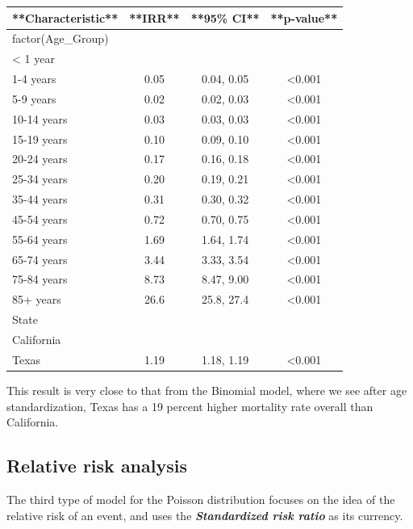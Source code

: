 \documentclass[
]{article}
\begin{document}
\begin{tabular}{l|c|c|c}
\hline
**Characteristic** & **IRR** & **95\% CI** & **p-value**\\
\hline
factor(Age\_Group) &  &  & \\
\hline
< 1 year &  &  & \\
\hline
1-4 years & 0.05 & 0.04, 0.05 & <0.001\\
\hline
5-9 years & 0.02 & 0.02, 0.03 & <0.001\\
\hline
10-14 years & 0.03 & 0.03, 0.03 & <0.001\\
\hline
15-19 years & 0.10 & 0.09, 0.10 & <0.001\\
\hline
20-24 years & 0.17 & 0.16, 0.18 & <0.001\\
\hline
25-34 years & 0.20 & 0.19, 0.21 & <0.001\\
\hline
35-44 years & 0.31 & 0.30, 0.32 & <0.001\\
\hline
45-54 years & 0.72 & 0.70, 0.75 & <0.001\\
\hline
55-64 years & 1.69 & 1.64, 1.74 & <0.001\\
\hline
65-74 years & 3.44 & 3.33, 3.54 & <0.001\\
\hline
75-84 years & 8.73 & 8.47, 9.00 & <0.001\\
\hline
85+ years & 26.6 & 25.8, 27.4 & <0.001\\
\hline
State &  &  & \\
\hline
California &  &  & \\
\hline
Texas & 1.19 & 1.18, 1.19 & <0.001\\
\hline
\end{tabular}

This result is very close to that from the Binomial model, where we see after age standardization, Texas has a 19 percent higher mortality rate overall than California.

\hypertarget{relative-risk-analysis}{%
\subsection{Relative risk analysis}\label{relative-risk-analysis}}

The third type of model for the Poisson distribution focuses on the idea of the relative risk of an event, and uses the \textbf{\emph{Standardized risk ratio}} as its currency.
\end{document}

